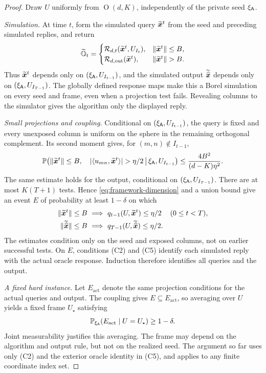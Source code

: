 \begin{proof}
Draw $U$ uniformly from $\operatorname O(d,K)$, independently of
the private seed $\xi_{{\mathsf{A}}}$.

\emph{Simulation.}
At time $t$, form the simulated query $\widetilde{\bm{x}}^t$ from the
seed and preceding simulated replies, and return
\[
 \widetilde{\mathbb O}_t=
 \begin{cases}
 \mathcal R_{d,t}(\widetilde\x^t,U_{I_t}),
       &\|\widetilde\x^t\|\le B,\\
 \mathcal R_{d,\mathrm{out}}(\widetilde\x^t),
       &\|\widetilde\x^t\|>B.
 \end{cases}
\]
Thus $\widetilde{\bm{x}}^t$ depends only on
$(\xi_{{\mathsf{A}}},U_{I_{t-1}})$, and the simulated output
$\widetilde{\widehat{\bm{x}}}$ depends only on
$(\xi_{{\mathsf{A}}},U_{I_{T-1}})$.
The globally defined response maps make this a Borel simulation on
every seed and frame, even when a projection test fails. Revealing
columns to the simulator gives the algorithm only the displayed reply.

\emph{Small projections and coupling.}
Conditional on $(\xi_{{\mathsf{A}}},U_{I_{t-1}})$, the query is fixed and
every unexposed column is uniform on the sphere in the remaining
orthogonal complement. Its second moment gives, for $(m,n)\notin I_{t-1}$,
\[
 \mathbb P\!\left(
  \|\widetilde\x^t\|\le B,\quad
  |\langle u_{mn},\widetilde\x^t\rangle|>\eta/2
  \,\middle|\,\xi_{\sA},U_{I_{t-1}}
 \right)
 \le\frac{4B^2}{(d-K)\eta^2}.
\]
The same estimate holds for the output, conditional on
$(\xi_{{\mathsf{A}}},U_{I_{T-1}})$.
There are at most $K(T+1)$ tests. Hence
\eqref{eq:framework-dimension} and a union bound give an event
$E$ of probability at least $1-\delta$ on which
\[
 \begin{aligned}
 \|\widetilde{\bm{x}}^t\|\le B
 &\ \Longrightarrow\ q_{t-1}(U,\widetilde{\bm{x}}^t)\le\eta/2
 &&(0\le t<T),\\
 \|\widetilde{\widehat{\bm{x}}}\|\le B
 &\ \Longrightarrow\ q_{T-1}(U,\widetilde{\widehat{\bm{x}}})\le\eta/2.
 \end{aligned}
\]
The estimates condition only on the seed and exposed columns, not
on earlier successful tests. On $E$, conditions \textnormal{(C2)}
and \textnormal{(C5)} identify each simulated reply with the actual
oracle response. Induction therefore identifies all queries and
the output.

\emph{A fixed hard instance.}
Let $E_{\mathrm{act}}$ denote the same projection conditions for
the actual queries and output. The coupling gives
$E\subseteq E_{\mathrm{act}}$, so averaging over $U$ yields a
fixed frame $U_\star$ satisfying
\begin{equation}
 \mathbb P_{\xi_{{\mathsf{A}}}}
 (E_{\mathrm{act}}\mid U=U_\star)\ge1-\delta.
 \label{eq:rotation-transcript}
\end{equation}
Joint measurability justifies this averaging. The frame may depend
on the algorithm and output rule, but not on the realized seed.
The argument so far uses only \textnormal{(C2)} and the exterior
oracle identity in \textnormal{(C5)}, and applies to any finite
coordinate index set.


\end{proof}
